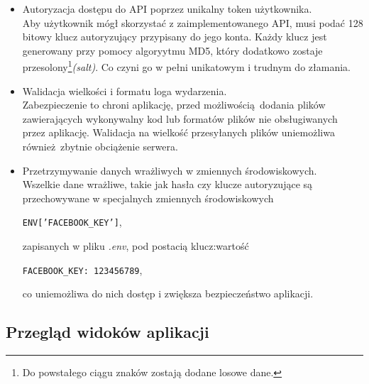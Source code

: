     \begin{itemize}
      \item Autoryzacja dostępu do API poprzez unikalny token użytkownika.\\
      Aby użytkownik mógł skorzystać z zaimplementowanego API, musi podać 128 bitowy klucz autoryzujący przypisany do jego konta. Każdy klucz jest generowany przy pomocy algoryytmu MD5, który dodatkowo zostaje przesolony\footnote{Do powstałego ciągu znaków zostają dodane losowe dane.}\emph{(salt)}. Co czyni go w pełni unikatowym i trudnym do złamania.

      \item Walidacja wielkości i formatu loga wydarzenia.\\
      Zabezpieczenie to chroni aplikację, przed możliwością dodania plików zawierających wykonywalny kod lub formatów plików nie obsługiwanych przez aplikację. Walidacja na wielkość przesyłanych plików uniemożliwa również zbytnie obciążenie serwera.

      \item Przetrzymywanie danych wrażliwych w zmiennych środowiskowych.\\
      Wszelkie dane wrażliwe, takie jak hasła czy klucze autoryzujące są przechowywane w specjalnych zmiennych środowiskowych
      \begin{center}
        \texttt{ENV['FACEBOOK\_KEY']},
      \end{center}
      zapisanych w pliku \emph{.env}, pod postacią klucz:wartość
      \begin{center}
        \texttt{FACEBOOK\_KEY: 123456789},
      \end{center}
      co uniemożliwa do nich dostęp i zwiększa bezpieczeństwo aplikacji.
    \end{itemize}
    \subsection{Przegląd widoków aplikacji}
